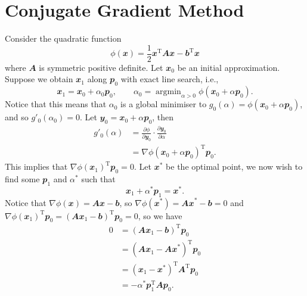 \documentclass[math, code]{amznotes}
\theoremstyle{remark}
\DeclareMathOperator*{\argmin}{argmin}
\begin{document}
\section{Conjugate Gradient Method}
Consider the quadratic function
\begin{equation*}
    \phi(\mathbfit{x}) = \frac{1}{2}\mathbfit{x}^{\mathrm{T}}\mathbfit{Ax} - \mathbfit{b}^{\mathrm{T}}\mathbfit{x}
\end{equation*}
where $\mathbfit{A}$ is symmetric positive definite. Let $\mathbfit{x}_0$ be an initial approximation. Suppose we obtain $\mathbfit{x}_1$ along $\mathbfit{p}_0$ with exact line search, i.e.,
\begin{equation*}
    \mathbfit{x}_1 = \mathbfit{x}_0 + \alpha_0\mathbfit{p}_0, \qquad \alpha_0 = \argmin_{\alpha > 0} \phi(\mathbfit{x}_0 + \alpha\mathbfit{p}_0).
\end{equation*}
Notice that this means that $\alpha_0$ is a global minimiser to $g_0(\alpha) = \phi(\mathbfit{x}_0 + \alpha\mathbfit{p}_0)$, and so $g'_0(\alpha_0) = 0$. Let $\mathbfit{y}_0 = \mathbfit{x}_0 + \alpha\mathbfit{p}_0$, then
\begin{align*}
    g'_0(\alpha) & = \frac{\partial \phi}{\partial \mathbfit{y}_0}\cdot\frac{\partial \mathbfit{y}_0}{\partial \alpha} \\
    & = \nabla \phi(\mathbfit{x}_0 + \alpha\mathbfit{p}_0)^{\mathrm{T}}\mathbfit{p}_0.
\end{align*}
This implies that $\nabla \phi(\mathbfit{x}_1)^{\mathrm{T}}\mathbfit{p}_0 = 0$. Let $\mathbfit{x}^*$ be the optimal point, we now wish to find some $\mathbfit{p}_1$ and $\alpha^*$ such that 
\begin{equation*}
    \mathbfit{x}_1 + \alpha^*\mathbfit{p}_1 = \mathbfit{x}^*.
\end{equation*}
Notice that $\nabla\phi(\mathbfit{x}) = \mathbfit{Ax - b}$, so $\nabla\phi(\mathbfit{x}^*) = \mathbfit{Ax}^* - \mathbfit{b} = 0$ and $\nabla \phi(\mathbfit{x}_1)^{\mathrm{T}}\mathbfit{p}_0 = (\mathbfit{Ax}_1 - \mathbfit{b})^{\mathrm{T}}\mathbfit{p}_0 = 0$, so we have
\begin{align*}
    0 & = (\mathbfit{Ax}_1 - \mathbfit{b})^{\mathrm{T}}\mathbfit{p}_0 \\
    & = (\mathbfit{Ax}_1 - \mathbfit{Ax}^*)^{\mathrm{T}}\mathbfit{p}_0 \\
    & = (\mathbfit{x}_1 - \mathbfit{x}^*)^{\mathrm{T}}\mathbfit{A}^{\mathrm{T}}\mathbfit{p}_0 \\
    & = -\alpha^*\mathbfit{p}_1^{\mathrm{T}}\mathbfit{A}\mathbfit{p}_0.
\end{align*}
\end{document}
